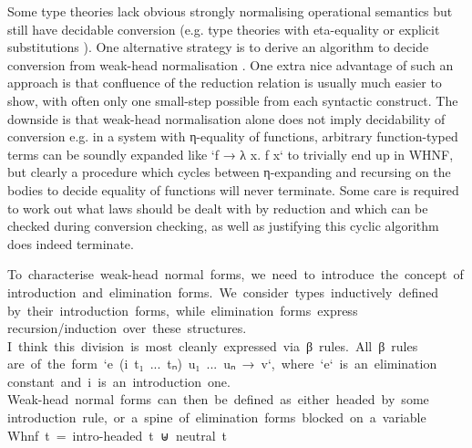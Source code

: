 \documentclass[
    a4paper, %
    fontsize=11pt, %
    twoside=false, %
	numbers=noenddot, %
	fontmethod=tex, %
]{kaobook}
\def\resethooks{%
  \global\let\SaveRestoreHook\empty
  \global\let\ColumnHook\empty}
\newlength{\blanklineskip}
\let\hspre\empty
\let\hspost\empty
\begin{document}
Some type theories lack obvious strongly normalising operational semantics but 
still have decidable conversion (e.g. type theories with eta-equality
or explicit substitutions ). 
One alternative strategy is to derive an
algorithm to decide conversion from weak-head normalisation 
. One extra nice advantage of such an approach is
that confluence of the reduction relation is usually much easier to show, with
often only one small-step possible from each syntactic construct. The downside
is that weak-head normalisation alone does not imply decidability of conversion 
e.g. in a system with η-equality of functions, arbitrary function-typed terms 
can be soundly expanded like `f → λ x. f x` to trivially end up in WHNF, but 
clearly a procedure which cycles between η-expanding and recursing on the bodies
to decide equality of functions will never terminate. Some care is required to
work out what laws should be dealt with by reduction and which can be checked
during conversion checking, as well as justifying this cyclic algorithm
does indeed terminate.


\begin{hscode}\SaveRestoreHook
\column{B}{@{}>{\hspre}l<{\hspost}@{}}%
\column{E}{@{}>{\hspre}l<{\hspost}@{}}%
\>[B]{}\mbox{\onelinecomment  To characterise weak-head normal forms, we need to introduce the concept of}{}\<[E]%
\\
\>[B]{}\mbox{\onelinecomment  introduction and elimination forms. We consider types inductively defined}{}\<[E]%
\\
\>[B]{}\mbox{\onelinecomment  by their introduction forms, while elimination forms express }{}\<[E]%
\\
\>[B]{}\mbox{\onelinecomment  recursion/induction over these structures.}{}\<[E]%
\\
\>[B]{}\mbox{\onelinecomment  I think this division is most cleanly expressed via β rules. All β rules}{}\<[E]%
\\
\>[B]{}\mbox{\onelinecomment  are of the form `e (i t₁ ... tₙ) u₁ ... uₙ → v`, where `e` is an elimination}{}\<[E]%
\\
\>[B]{}\mbox{\onelinecomment  constant and i is an introduction one.}{}\<[E]%
\\[\blanklineskip]%
\>[B]{}\mbox{\onelinecomment  Weak-head normal forms can then be defined as either headed by some}{}\<[E]%
\\
\>[B]{}\mbox{\onelinecomment  introduction rule, or a spine of elimination forms blocked on a variable}{}\<[E]%
\\
\>[B]{}\mbox{\onelinecomment  Whnf t = intro-headed t ⊎ neutral t}{}\<[E]%
\ColumnHook
\end{hscode}\resethooks
\end{document}
